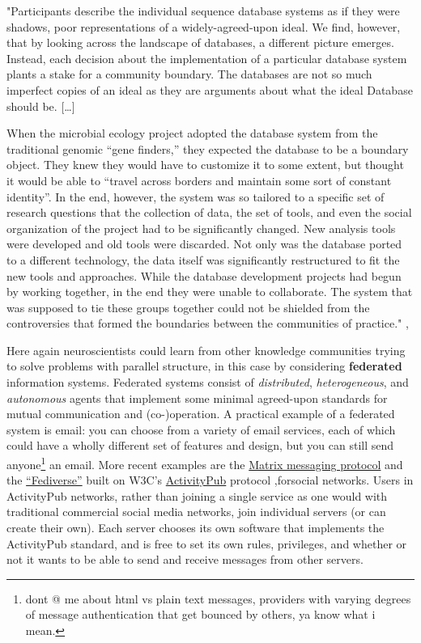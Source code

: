 \documentclass{article}
\begin{document}
\begin{leftbar}
"Participants describe the individual sequence database systems as if
they were shadows, poor representations of a widely-agreed-upon ideal.
We find, however, that by looking across the landscape of databases, a
different picture emerges. Instead, each decision about the
implementation of a particular database system plants a stake for a
community boundary. The databases are not so much imperfect copies of an
ideal as they are arguments about what the ideal Database should be.
{[}\ldots{]}

When the microbial ecology project adopted the database system from the
traditional genomic ``gene finders,'' they expected the database to be a
boundary object. They knew they would have to customize it to some
extent, but thought it would be able to ``travel across borders and
maintain some sort of constant identity''. In the end, however, the
system was so tailored to a specific set of research questions that the
collection of data, the set of tools, and even the social organization
of the project had to be significantly changed. New analysis tools were
developed and old tools were discarded. Not only was the database ported
to a different technology, the data itself was significantly
restructured to fit the new tools and approaches. While the database
development projects had begun by working together, in the end they were
unable to collaborate. The system that was supposed to tie these groups
together could not be shielded from the controversies that formed the
boundaries between the communities of practice." \cite{bietzCollaborationMetagenomicsSequence2009},\end{leftbar}
Here again neuroscientists could learn from other knowledge communities
trying to solve problems with parallel structure, in this case by
considering \textbf{federated} information systems. Federated systems
consist of \emph{distributed}, \emph{heterogeneous}, and
\emph{autonomous} agents that implement some minimal agreed-upon
standards for mutual communication and (co-)operation. A practical
example of a federated system is email: you can choose from a variety of
email services, each of which could have a wholly different set of
features and design, but you can still send anyone\footnote{dont @ me
  about html vs plain text messages, providers with varying degrees of
  message authentication that get bounced by others, ya know what i
  mean.} an email. More recent examples are the
\href{https://matrix.org/}{Matrix messaging protocol} and the
\href{https://en.wikipedia.org/wiki/Fediverse}{``Fediverse''} built on
W3C's
\href{https://www.w3.org/TR/2018/REC-activitypub-20180123/}{ActivityPub}
protocol \cite{Webber:18:A},forsocial networks. Users in
ActivityPub networks, rather than joining a single service as one would
with traditional commercial social media networks, join individual
servers (or can create their own). Each server chooses its own software
that implements the ActivityPub standard, and is free to set its own
rules, privileges, and whether or not it wants to be able to send and
receive messages from other servers.
\end{document}
